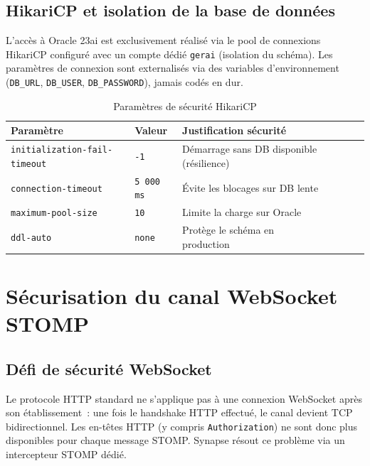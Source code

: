 \subsection{HikariCP et isolation de la base de données}

L'accès à Oracle 23ai est exclusivement réalisé via le pool de connexions HikariCP
configuré avec un compte dédié \texttt{gerai} (isolation du schéma). Les paramètres
de connexion sont externalisés via des variables d’environnement
(\texttt{DB\_URL}, \texttt{DB\_USER}, \texttt{DB\_PASSWORD}), jamais codés en dur.

\begin{table}[H]
\centering
\caption{Paramètres de sécurité HikariCP}
\label{tab:hikari_security}
\begin{tabularx}{\textwidth}{VlVlVLV}
\hline
\textbf{Paramètre} & \textbf{Valeur} & \textbf{Justification sécurité} \\
\hline
\texttt{initialization-fail-timeout} & \texttt{-1} & Démarrage sans DB disponible (résilience) \\
\hline
\texttt{connection-timeout} & \texttt{5 000 ms} & Évite les blocages sur DB lente \\
\hline
\texttt{maximum-pool-size} & \texttt{10} & Limite la charge sur Oracle \\
\hline
\texttt{ddl-auto} & \texttt{none} & Protège le schéma en production \\
\hline
\end{tabularx}
\end{table}

\section{Sécurisation du canal WebSocket STOMP}

\subsection{Défi de sécurité WebSocket}

Le protocole HTTP standard ne s'applique pas à une connexion WebSocket après son
établissement~: une fois le handshake HTTP effectué, le canal devient TCP bidirectionnel.
Les en-têtes HTTP (y compris \texttt{Authorization}) ne sont donc plus disponibles pour
chaque message STOMP. Synapse résout ce problème via un intercepteur STOMP dédié.

